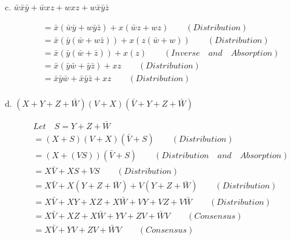\documentclass{article}
\begin{document}
    \newpage
    \begin{flushleft}
        c. $\bar{w}\bar{x}\bar{y} + \bar{w}xz + wxz + w\bar{x}\bar{y}\bar{z}$
    \end{flushleft}
    \begin{align*}
        &= \bar{x}(\bar{w}\bar{y} + w\bar{y}\bar{z}) + x(\bar{w}z + wz) \qquad (Distribution) \\
        &= \bar{x}(\bar{y}(\bar{w} + w\bar{z})) + x(z(\bar{w} + w)) \qquad (Distribution) \\
        &= \bar{x}(\bar{y}(\bar{w} + \bar{z})) + x(z) \qquad (Inverse \quad and \quad Absorption)\\
        &= \bar{x}(\bar{y}\bar{w} + \bar{y}\bar{z}) + xz \qquad (Distribution) \\
        &= \bar{x}\bar{y}\bar{w} + \bar{x}\bar{y}\bar{z} + xz \qquad (Distribution) \\
    \end{align*}
    \begin{flushleft}
        d. $\left(X + Y + Z + \bar{W}\right)\left(V + X\right)\left( \bar{V} + Y + Z + \bar{W}\right)$
    \end{flushleft}
    \begin{align*}
        &Let \quad S = Y + Z + \bar{W} \\
        &= \left(X + S\right)\left(V + X\right)\left(\bar{V} + S\right) \qquad (Distribution) \\
        &= \left(X + \left(VS\right)\right)\left( \bar{V} + S\right) \qquad (Distribution \quad and \quad Absorption) \\
        &= X\bar{V} + XS + VS \qquad (Distribution) \\
        &= X\bar{V} + X\left(Y + Z + \bar{W}\right) + V\left(Y + Z + \bar{W}\right) \qquad (Distribution) \\
        &= X\bar{V} + XY + XZ + X\bar{W} + VY + VZ +V\bar{W} \qquad (Distribution) \\
        &= X\bar{V} + XZ + X\bar{W} + YV + ZV + \bar{W}V \qquad (Consensus) \\
        &= X\bar{V} + YV + ZV + \bar{W}V \qquad (Consensus) \\
    \end{align*}
\end{document}

